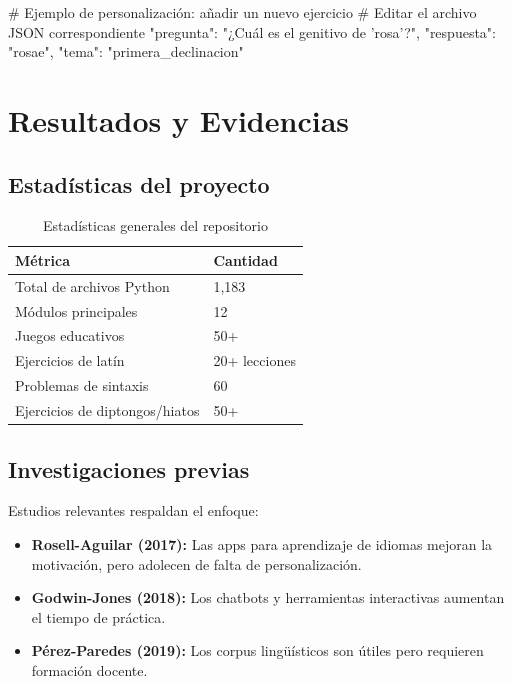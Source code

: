 \documentclass[12pt,spanish]{article}
\begin{document}
\begin{codigo}
# Ejemplo de personalización: añadir un nuevo ejercicio
# Editar el archivo JSON correspondiente
{
    "pregunta": "¿Cuál es el genitivo de 'rosa'?",
    "respuesta": "rosae",
    "tema": "primera_declinacion"
}
\end{codigo}

\section{Resultados y Evidencias}

\subsection{Estadísticas del proyecto}

\begin{table}[H]
\centering
\caption{Estadísticas generales del repositorio}
\label{tab:estadisticas}
\begin{tabular}{|p{5cm}|p{4cm}|}
\hline
\textbf{Métrica} & \textbf{Cantidad} \\
\hline
Total de archivos Python & 1,183 \\
\hline
Módulos principales & 12 \\
\hline
Juegos educativos & 50+ \\
\hline
Ejercicios de latín & 20+ lecciones \\
\hline
Problemas de sintaxis & 60 \\
\hline
Ejercicios de diptongos/hiatos & 50+ \\
\hline
\end{tabular}
\end{table}

\subsection{Investigaciones previas}

Estudios relevantes respaldan el enfoque:

\begin{itemize}
    \item \textbf{Rosell-Aguilar (2017):} Las apps para aprendizaje de idiomas mejoran la motivación, pero adolecen de falta de personalización.
    \item \textbf{Godwin-Jones (2018):} Los chatbots y herramientas interactivas aumentan el tiempo de práctica.
    \item \textbf{Pérez-Paredes (2019):} Los corpus lingüísticos son útiles pero requieren formación docente.
\end{itemize}
\end{document}

